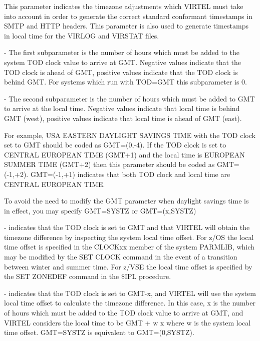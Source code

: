 \documentclass[letterpaper,10pt,english]{sphinxmanual}
\begin{document}
This parameter indicates the timezone adjustments which VIRTEL must take into account in order to generate the correct standard conformant timestamps in SMTP and HTTP headers. This parameter is also used to generate
timestamps in local time for the VIRLOG and VIRSTAT files.

 - The first subparameter is the number of hours which must be added to the system TOD clock value to arrive at GMT. Negative values indicate that the TOD clock is ahead of GMT, positive values indicate that the TOD clock is behind GMT. For systems which run with TOD=GMT this subparameter is 0.

 - The second subparameter is the number of hours which must be added to GMT to arrive at the local time. Negative values indicate that local time is behind GMT (west), positive values indicate that local time is ahead of GMT (east).

For example, USA EASTERN DAYLIGHT SAVINGS TIME with the TOD clock set to GMT should be coded as GMT=(0,-4). If the TOD clock is set to CENTRAL EUROPEAN TIME (GMT+1) and the local time is EUROPEAN SUMMER TIME (GMT+2) then this parameter should be coded as GMT=(-1,+2). GMT=(-1,+1) indicates that both TOD clock and local time are CENTRAL EUROPEAN TIME.

To avoid the need to modify the GMT parameter when daylight savings time is in effect, you may specify GMT=SYSTZ or GMT=(x,SYSTZ)

 - indicates that the TOD clock is set to GMT and that VIRTEL will obtain the timezone difference by inspecting the system local time offset. For z/OS the local time offset is specified in the CLOCKxx member of the system PARMLIB, which may be modified by the SET CLOCK command in the event of a transition between winter and summer time. For z/VSE the local time offset is specified by the SET ZONEDEF command in the \$IPL procedure.

 - indicates that the TOD clock is set to GMT-x, and VIRTEL will use the system local time offset to calculate the timezone difference. In this case, x is the number of hours which must be added to the TOD clock value to arrive at GMT, and VIRTEL considers the local time to be GMT + w \textendash{} x where w is the system local time offset. GMT=SYSTZ is equivalent to GMT=(0,SYSTZ).

\ignorespaces 
\end{document}
